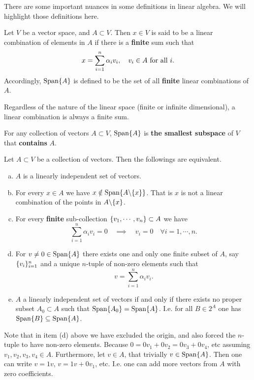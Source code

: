  
 \begin{summary}
 	There are some important nuances in some definitions in linear algebra. We will highlight those definitions here.
 	\begin{definition}
 		Let $ V $ be a vector space, and $ A\subset V $. Then $ x\in V $ is said to be a linear combination of elements in $ A $ if there is a \textbf{finite} sum such that
 		\[ x = \sum_{i=1}^{n}\alpha_i v_i, \quad v_i \in A \text{ for all $ i $}. \]
 		Accordingly, $ \operatorname{Span}\{A\} $ is defined to be the set of all \textbf{finite} linear combinations of $ A $.
 	\end{definition}
 	\begin{remark}
 		Regardless of the nature of the linear space (finite or infinite dimensional), a linear combination is always a finite sum.
 	\end{remark}
 	\begin{proposition}
 		For any collection of vectors $ A \subset V $, $ \operatorname{Span}\{A\} $ is \textbf{the smallest subspace} of $ V $ that \textbf{contains} $ A $.
 	\end{proposition}
 	
 	\begin{proposition}
 		Let $ A\subset V $ be a collection of vectors. Then the followings are equivalent.
 		\begin{enumerate}[(a)]
 			\item $ A $ is a linearly independent set of vectors.
 			\item For every $ x\in A $ we have $ x\notin\operatorname{Span}\{A\backslash\{x\}\} $. That is $ x $ is not a linear combination of the points in $ A\backslash\{x\} $.
 			\item For every \textbf{finite} sub-collection $ \{v_1,\cdots,v_n\} \subset A $ we have
 			\[ \sum_{i=1}^{n}\alpha_i v_i = 0 \quad \implies \quad v_i = 0 \quad \forall i=1,\cdots,n. \]
 			\item For $ v\neq 0 \in \operatorname{Span}\{A\} $ there exists one and only one finite subset of $ A $, say $ \{v_i\}_{i=1}^n $ and a unique $ n $-tuple of non-zero elements such that
 			\[ v = \sum_{i=1}^{n} \alpha_i v_i.  \]
 			
 			\item $ A $ a linearly independent set of vectors if and only if there exists no proper subset $ A_0 \subset A $ such that $ \operatorname{Span}\{A_0\} = \operatorname{Span}\{A\} $. I.e. for all $ B \in 2^A $ one has $ \operatorname{Span}\{B\} \subseteq \operatorname{Span}\{A\} $.
 		\end{enumerate}
 	\end{proposition}
 	\begin{remark}
 		Note that in item (d) above we have excluded the origin, and also forced the $ n $-tuple to have non-zero elements. Because $  0 = 0 v_1 + 0v_2 = 0v_3 + 0v_4 $, etc assuming $ v_1,v_2,v_3,v_4\in A $. Furthermore, let $ v \in A $, that trivially $ v\in \operatorname{Span}\{A\} $. Then one can write $ v = 1v $, $ v=1v+0v_1 $, etc. I.e. one can add more vectors from $ A $ with zero coefficients.
 	\end{remark}
 \end{summary}
 
